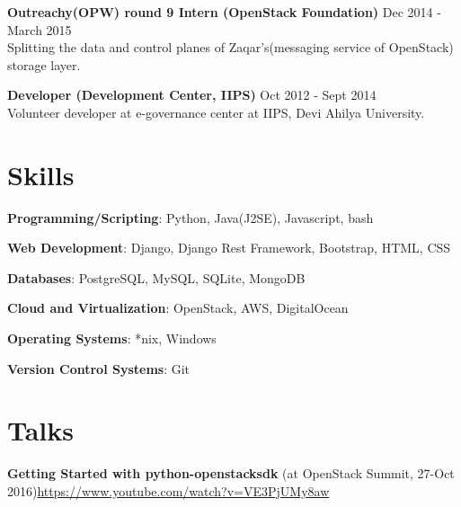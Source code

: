 \documentclass[margin,line]{resume}
\begin{document}
\begin{resume}
\begin{list2}
	\item \textbf{Outreachy(OPW) round 9 Intern (OpenStack Foundation)} \hspace{18mm} Dec 2014 - March 2015 \\ Splitting the data and control planes of Zaqar's(messaging service of OpenStack) storage layer.

	\item \textbf{Developer (Development Center, IIPS)} \hspace{52mm} Oct 2012 - Sept 2014 \\ Volunteer developer at e-governance center at IIPS, Devi Ahilya University.

	\end{list2}

    \section{\mysidestyle Skills} 

    \begin{list2}
	\item \textbf{Programming/Scripting}: \hspace{3mm} Python, Java(J2SE), Javascript, bash
	\item \textbf{Web Development}: \hspace{13mm}  Django, Django Rest Framework, Bootstrap, HTML, CSS
	\item \textbf{Databases}: \hspace{28mm} PostgreSQL, MySQL, SQLite,	MongoDB
	\item \textbf{Cloud and Virtualization}: \hspace{1mm} OpenStack, AWS, DigitalOcean
	\item \textbf{Operating Systems}: \hspace{12mm} *nix, Windows
    \item \textbf{Version Control Systems}: \hspace{2mm} Git
	\end{list2}

    \section{\mysidestyle Talks}
    \begin{list2}
    \item \textbf{Getting Started with python-openstacksdk } (at OpenStack Summit, 27-Oct 2016)\url{https://www.youtube.com/watch?v=VE3PjUMy8aw}
    \end{list2}


\end{resume}
\end{document}
